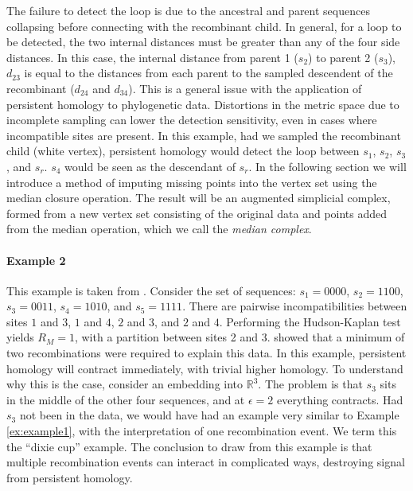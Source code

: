 The failure to detect the loop is due to the ancestral and parent sequences collapsing before connecting with the recombinant child.
In general, for a loop to be detected, the two internal distances must be greater than any of the four side distances.
In this case, the internal distance from parent 1 ($s_2$) to parent 2 ($s_3$), $d_{23}$ is equal to the distances from each parent to the sampled descendent of the recombinant ($d_{24}$ and $d_{34}$).
This is a general issue with the application of persistent homology to phylogenetic data.
Distortions in the metric space due to incomplete sampling can lower the detection sensitivity, even in cases where incompatible sites are present.
In this example, had we sampled the recombinant child (white vertex), persistent homology would detect the loop between $s_1$, $s_2$, $s_3$, and $s_r$.
$s_4$ would be seen as the descendant of $s_r$.
In the following section we will introduce a method of imputing missing points into the vertex set using the median closure operation.
The result will be an augmented simplicial complex, formed from a new vertex set consisting of the original data and points added from the median operation, which we call the \emph{median complex}.

\paragraph{Example 2}
\label{ex:example2}
%
This example is taken from \citet{Song:2005}.
Consider the set of sequences: $s_{1}=0000$, $s_{2}=1100$, $s_{3}=0011$, $s_{4}=1010$, and $s_{5}=1111$.
There are pairwise incompatibilities between sites $1$ and $3$, $1$ and $4$, $2$ and $3$, and $2$ and $4$.
Performing the Hudson-Kaplan test yields $R_M=1$, with a partition between sites 2 and 3.
\citet{Song:2005} showed that a minimum of two recombinations were required to explain this data.
In this example, persistent homology will contract immediately, with trivial higher homology.
To understand why this is the case, consider an embedding into $\mathbb{R}^3$.
The problem is that $s_{3}$ sits in the middle of the other four sequences, and at $\epsilon=2$ everything contracts.
Had $s_{3}$ not been in the data, we would have had an example very similar to Example \ref{ex:example1}, with the interpretation of one recombination event.
We term this the ``dixie cup'' example.
The conclusion to draw from this example is that multiple recombination events can interact in complicated ways, destroying signal from persistent homology.

